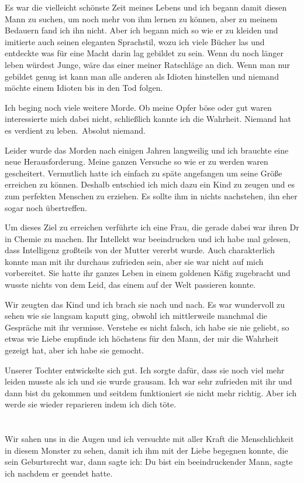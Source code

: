 \documentclass[11pt, a5paper]{article}
\newcommand{\nL}{Niemand hat es verdient zu leben.}
\begin{document}
\begin{spacing}{1.2}
		Es war die vielleicht schönste Zeit meines Lebens und ich begann damit diesen Mann zu suchen, um noch mehr von ihm lernen zu können, aber zu meinem Bedauern fand ich ihn nicht. Aber ich begann mich so wie er zu kleiden und imitierte auch seinen eleganten Sprachstil, wozu ich viele Bücher las und entdeckte was für eine Macht darin lag gebildet zu sein. Wenn du noch länger leben würdest Junge, wäre das einer meiner Ratschläge an dich. Wenn man nur gebildet genug ist kann man alle anderen als Idioten hinstellen und niemand möchte einem Idioten bis in den Tod folgen.
		
		Ich beging noch viele weitere Morde. Ob meine Opfer böse oder gut waren interessierte mich dabei nicht, schließlich kannte ich die Wahrheit. \nL\ Absolut niemand.
		
		Leider wurde das Morden nach einigen Jahren langweilig und ich brauchte eine neue Herausforderung. Meine ganzen Versuche so wie er zu werden waren gescheitert. Vermutlich hatte ich einfach zu späte angefangen um seine Größe erreichen zu können. Deshalb entschied ich mich dazu ein Kind zu zeugen und es zum perfekten Menschen zu erziehen. Es sollte ihm in nichts nachstehen, ihn eher sogar noch übertreffen.
		
		Um dieses Ziel zu erreichen verführte ich eine Frau, die gerade dabei war ihren Dr in Chemie zu machen. Ihr Intellekt war beeindrucken und ich habe mal gelesen, dass Intelligenz großteils von der Mutter vererbt wurde. Auch charakterlich konnte man mit ihr durchaus zufrieden sein, aber sie war nicht auf mich vorbereitet. Sie hatte ihr ganzes Leben in einem goldenen Käfig zugebracht und wusste nichts von dem Leid, das einem auf der Welt passieren konnte.
		
		Wir zeugten das Kind und ich brach sie nach und nach. Es war wundervoll zu sehen wie sie langsam kaputt ging, obwohl ich mittlerweile manchmal die Gespräche mit ihr vermisse. Verstehe es nicht falsch, ich habe sie nie geliebt, so etwas wie Liebe empfinde ich höchstens für den Mann, der mir die Wahrheit gezeigt hat, aber ich habe sie gemocht.
		
		Unserer Tochter entwickelte sich gut. Ich sorgte dafür, dass sie noch viel mehr leiden musste als ich und sie wurde grausam. Ich war sehr zufrieden mit ihr und dann bist du gekommen und seitdem funktioniert sie nicht mehr richtig. Aber ich werde sie wieder reparieren indem ich dich töte.\newpage
		
		\section{}
		Wir sahen uns in die Augen und ich versuchte mit aller Kraft die Menschlichkeit in diesem Monster zu sehen, damit ich ihm mit der Liebe begegnen konnte, die sein Geburtsrecht war, dann sagte ich: \frqq Du bist ein beeindruckender Mann\flqq , sagte ich nachdem er geendet hatte.
		

\end{spacing}
\end{document}
